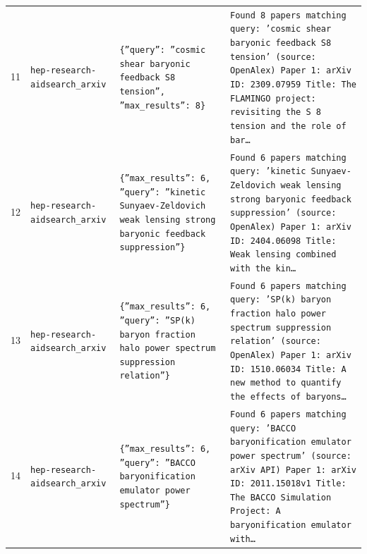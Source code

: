 \documentclass[11pt,a4paper]{article}
\begin{document}
\begin{longtable}{@{}p{}p{}p{}p{}@{}}
11 & \texttt{hep-research-aid}\newline\texttt{search\_\allowbreak{}arxiv} & \texttt{\{''query'':\allowbreak{} ''cosmic shear baryonic feedback S8 tension'',\allowbreak{} ''max\_\allowbreak{}results'':\allowbreak{} 8\}\allowbreak{}} & \texttt{Found 8 papers matching query:\allowbreak{} 'cosmic shear baryonic feedback S8 tension' (source:\allowbreak{} OpenAlex)\allowbreak{}  Paper 1:\allowbreak{} arXiv ID:\allowbreak{} 2309.07959 Title:\allowbreak{} The FLAMINGO project:\allowbreak{} revisiting the S 8 tension and the role of bar\ldots{}\allowbreak{}} \\
12 & \texttt{hep-research-aid}\newline\texttt{search\_\allowbreak{}arxiv} & \texttt{\{''max\_\allowbreak{}results'':\allowbreak{} 6,\allowbreak{} ''query'':\allowbreak{} ''kinetic Sunyaev-Zeldovich weak lensing strong baryonic feedback suppression''\}\allowbreak{}} & \texttt{Found 6 papers matching query:\allowbreak{} 'kinetic Sunyaev-Zeldovich weak lensing strong baryonic feedback suppression' (source:\allowbreak{} OpenAlex)\allowbreak{}  Paper 1:\allowbreak{} arXiv ID:\allowbreak{} 2404.06098 Title:\allowbreak{} Weak lensing combined with the kin\ldots{}\allowbreak{}} \\
13 & \texttt{hep-research-aid}\newline\texttt{search\_\allowbreak{}arxiv} & \texttt{\{''max\_\allowbreak{}results'':\allowbreak{} 6,\allowbreak{} ''query'':\allowbreak{} ''SP(k)\allowbreak{} baryon fraction halo power spectrum suppression relation''\}\allowbreak{}} & \texttt{Found 6 papers matching query:\allowbreak{} 'SP(k)\allowbreak{} baryon fraction halo power spectrum suppression relation' (source:\allowbreak{} OpenAlex)\allowbreak{}  Paper 1:\allowbreak{} arXiv ID:\allowbreak{} 1510.06034 Title:\allowbreak{} A new method to quantify the effects of baryons\ldots{}\allowbreak{}} \\
14 & \texttt{hep-research-aid}\newline\texttt{search\_\allowbreak{}arxiv} & \texttt{\{''max\_\allowbreak{}results'':\allowbreak{} 6,\allowbreak{} ''query'':\allowbreak{} ''BACCO baryonification emulator power spectrum''\}\allowbreak{}} & \texttt{Found 6 papers matching query:\allowbreak{} 'BACCO baryonification emulator power spectrum' (source:\allowbreak{} arXiv API)\allowbreak{}  Paper 1:\allowbreak{} arXiv ID:\allowbreak{} 2011.15018v1 Title:\allowbreak{} The BACCO Simulation Project:\allowbreak{} A baryonification emulator with\ldots{}\allowbreak{}} \\

\end{longtable}
\end{document}
